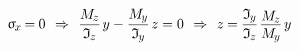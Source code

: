 \documentclass[14pt]{extarticle}
\begin{document}
\[
\upsigma_{\hspace{-0.2ex}\scalebox{.8}{$x$}} \hspace{-0.2ex}
=\hspace{-.1ex} 0
\hspace{.4em}\Rightarrow\hspace{.4em}
\displaystyle\frac{M_{\hspace{-0.1ex}\scalebox{.8}{$z$}}}{\mathfrak{I}_{\hspace{-0.1ex}\scalebox{.8}{$z$}}} \hspace{.25ex} y
- \displaystyle\frac{M_{\hspace{-0.1ex}\scalebox{.8}{$y$}}}{\mathfrak{I}_{\hspace{-0.1ex}\scalebox{.8}{$y$}}} \hspace{.25ex} z
= 0
\hspace{.4em}\Rightarrow\hspace{.4em}
z \hspace{-.1ex}=\hspace{-.1ex}
\displaystyle\frac{\mathfrak{I}_{\hspace{-0.1ex}\scalebox{.8}{$y$}}}{\mathfrak{I}_{\hspace{-0.1ex}\scalebox{.8}{$z$}}} \hspace{.2ex}
\displaystyle\frac{\raisebox{-0.12em}{$M_{\hspace{-0.1ex}\scalebox{.8}{$z$}}$}}{M_{\hspace{-0.1ex}\scalebox{.8}{$y$}}}
\hspace{.3ex} y
\]
\end{document}
